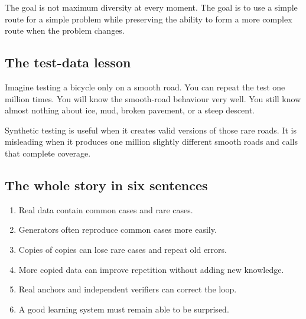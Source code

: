 \begin{mmalsnote}
The goal is not maximum diversity at every moment. The goal is to use a simple route for a simple problem while preserving the ability to form a more complex route when the problem changes.
\end{mmalsnote}

\subsection{The test-data lesson}

Imagine testing a bicycle only on a smooth road. You can repeat the test one million times. You will know the smooth-road behaviour very well. You still know almost nothing about ice, mud, broken pavement, or a steep descent.

Synthetic testing is useful when it creates valid versions of those rare roads. It is misleading when it produces one million slightly different smooth roads and calls that complete coverage.

\subsection{The whole story in six sentences}

\begin{enumerate}[leftmargin=*]
  \item Real data contain common cases and rare cases.
  \item Generators often reproduce common cases more easily.
  \item Copies of copies can lose rare cases and repeat old errors.
  \item More copied data can improve repetition without adding new knowledge.
  \item Real anchors and independent verifiers can correct the loop.
  \item A good learning system must remain able to be surprised.
\end{enumerate}
